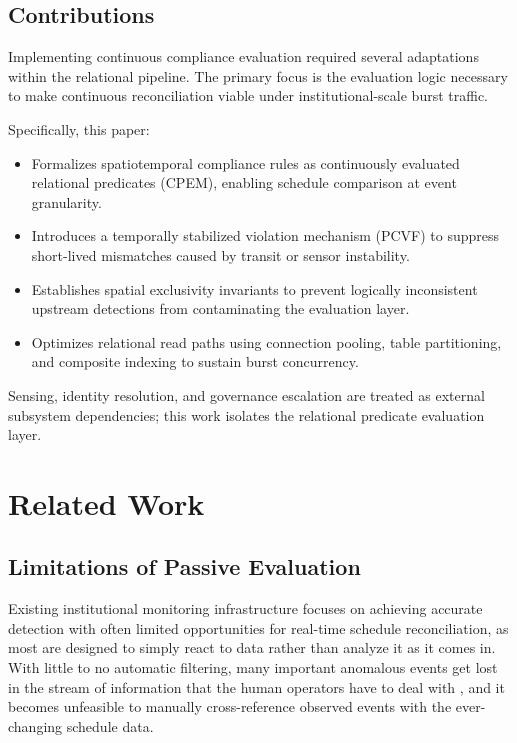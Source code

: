 \documentclass[conference]{IEEEtran}
\begin{document}
\subsection{Contributions}
Implementing continuous compliance evaluation required several adaptations within the relational pipeline. The primary focus is the evaluation logic necessary to make continuous reconciliation viable under institutional-scale burst traffic.

Specifically, this paper:
\begin{itemize}
    \item Formalizes spatiotemporal compliance rules as continuously evaluated relational predicates (CPEM), enabling schedule comparison at event granularity.
    \item Introduces a temporally stabilized violation mechanism (PCVF) to suppress short-lived mismatches caused by transit or sensor instability.
    \item Establishes spatial exclusivity invariants to prevent logically inconsistent upstream detections from contaminating the evaluation layer.
    \item Optimizes relational read paths using connection pooling, table partitioning, and composite indexing to sustain burst concurrency.
\end{itemize}

Sensing, identity resolution, and governance escalation are treated as external subsystem dependencies; this work isolates the relational predicate evaluation layer.

\section{Related Work}

\subsection{Limitations of Passive Evaluation}
Existing institutional monitoring infrastructure focuses on achieving accurate detection with often limited opportunities for real-time schedule reconciliation, as most are designed to simply react to data rather than analyze it as it comes in. With little to no automatic filtering, many important anomalous events get lost in the stream of information that the human operators have to deal with \cite{b7}, and it becomes unfeasible to manually cross-reference observed events with the ever-changing schedule data.
\end{document}
